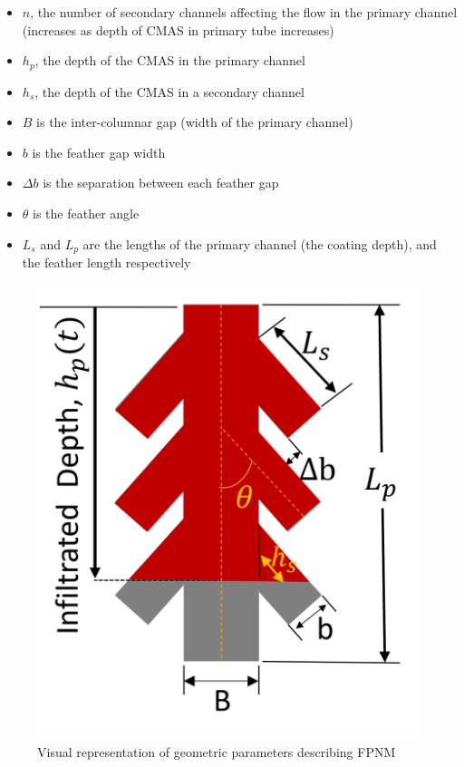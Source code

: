 \documentclass[%
 aip,
 amsmath,amssymb,
 reprint,%
floatfix]{revtex4-1}
\begin{document}
\begin{itemize}
    \item $n$, the number of secondary channels affecting the flow in the primary channel (increases as depth of CMAS in primary tube increases)
    \item $h_{p}$, the depth of the CMAS in the primary channel
    \item $h_{s}$, the depth of the CMAS in a secondary channel
    \item $B$ is the inter-columnar gap (width of the primary channel)
    \item $b$ is the feather gap width
    \item $\Delta b$ is the separation between each feather gap
    \item $\theta$ is the feather angle
    \item $L_{s}$ and $L_{p}$ are the lengths of the primary channel (the coating depth), and the feather length respectively
\end{itemize}

\begin{figure}
    \centering
    \includegraphics[width=\linewidth]{Figures/FPNM_cartoon.png}
    \caption{Visual representation of geometric parameters describing FPNM}
    \label{fig:FPNM_cartoon}
\end{figure}
\end{document}
